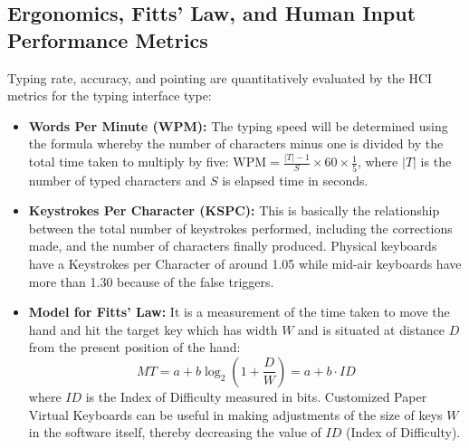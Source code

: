 \subsection{Ergonomics, Fitts' Law, and Human Input Performance Metrics}
\label{subsec:lit_fitts_law}
Typing rate, accuracy, and pointing are quantitatively evaluated by the HCI metrics for the typing interface type:
\begin{itemize}
    \item \textbf{Words Per Minute (WPM):} The typing speed will be determined using the formula whereby the number of characters minus one is divided by the total time taken to multiply by five: $\text{WPM} = \frac{|T| - 1}{S} \times 60 \times \frac{1}{5}$, where $|T|$ is the number of typed characters and $S$ is elapsed time in seconds.
    \item \textbf{Keystrokes Per Character (KSPC):} This is basically the relationship between the total number of keystrokes performed, including the corrections made, and the number of characters finally produced. Physical keyboards have a Keystrokes per Character of around 1.05 while mid-air keyboards have more than 1.30 because of the false triggers.
    \item \textbf{Model for Fitts' Law:} It is a measurement of the time taken to move the hand and hit the target key which has width $W$ and is situated at distance $D$ from the present position of the hand:
    \begin{equation}
    MT = a + b \log_2 \left( 1 + \frac{D}{W} \right) = a + b \cdot ID
    \label{eq:fitts_law}
    \end{equation}
    where $ID$ is the Index of Difficulty measured in bits. Customized Paper Virtual Keyboards can be useful in making adjustments of the size of keys $W$ in the software itself, thereby decreasing the value of $ID$ (Index of Difficulty).
\end{itemize}

